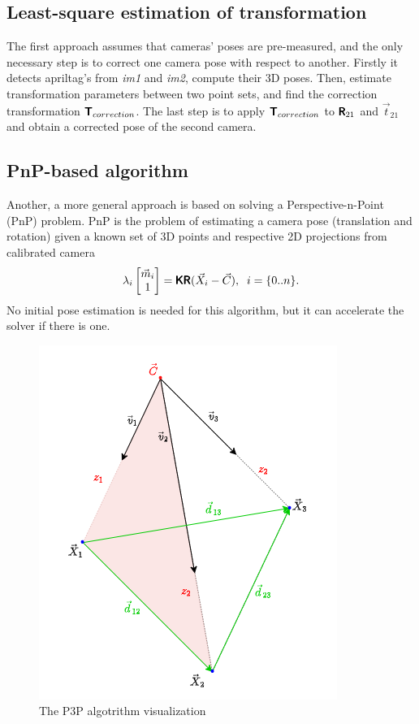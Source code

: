 \subsection{Least-square estimation of transformation}
\label{sec:lsq_umeyama}
The first approach assumes that cameras' poses are pre-measured, and the only necessary step is to correct one camera pose with respect to another.
Firstly it detects apriltag's from \textit{im1} and \textit{im2}, compute their 3D poses.
Then, estimate transformation parameters between two point sets, and find the correction transformation $\pmb{\mathsf{T}}_{correction}$.
The last step is to apply $\pmb{\mathsf{T}}_{correction}$ to $\pmb{\mathsf{R}}_{21}$ and $\vec{t}_{21}$ and obtain a corrected pose of the second camera.

\subsection{PnP-based algorithm}
\label{sec:pnp}
Another, a more general approach is based on solving a Perspective-n-Point (PnP) problem.
PnP is the problem of estimating a camera pose (translation and rotation) given a known set of 3D points and respective 2D projections from calibrated camera
\begin{equation}
    \lambda_i \begin{bmatrix} \vec{m}_i \\ 1 \end{bmatrix} = \pmb{\mathsf{K}} \pmb{\mathsf{R}} (\vec{X}_i - \vec{C}), \;\; i = \{0..n\}.
\end{equation}
No initial pose estimation is needed for this algorithm, but it can accelerate the solver if there is one.

\begin{figure}[h]
    \centering
    \includegraphics[width=.3\textwidth]{graphics/p3p.png}
    \caption{The P3P algotrithm visualization}
    \label{fig:p3p}
\end{figure}

